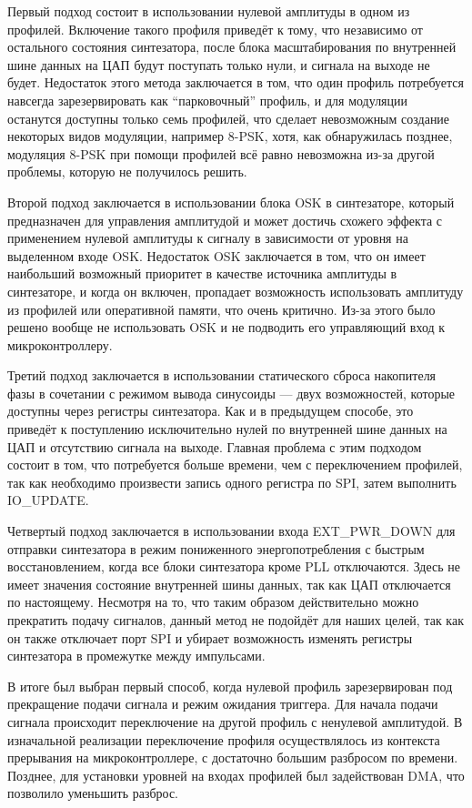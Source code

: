 \documentclass[rusmathsym, eqnumwithinsec, amspack, hyperref]{bomgost}
\begin{document}
Первый подход состоит в использовании нулевой амплитуды в одном из профилей. Включение такого профиля приведёт к тому, что независимо от остального состояния синтезатора, после блока масштабирования по внутренней шине данных на ЦАП будут поступать только нули, и сигнала на выходе не будет. Недостаток этого метода заключается в том, что один профиль потребуется навсегда зарезервировать как ``парковочный'' профиль, и для модуляции останутся доступны только семь профилей, что сделает невозможным создание некоторых видов модуляции, например 8-PSK, хотя, как обнаружилась позднее, модуляция 8-PSK при помощи профилей всё равно невозможна из-за другой проблемы, которую не получилось решить.

Второй подход заключается в использовании блока OSK в синтезаторе, который предназначен для управления амплитудой и может достичь схожего эффекта с применением нулевой амплитуды к сигналу в зависимости от уровня на выделенном входе OSK. Недостаток OSK заключается в том, что он имеет наибольший возможный приоритет в качестве источника амплитуды в синтезаторе, и когда он включен, пропадает возможность использовать амплитуду из профилей или оперативной памяти, что очень критично. Из-за этого было решено вообще не использовать OSK и не подводить его управляющий вход к микроконтроллеру.

Третий подход заключается в использовании статического сброса накопителя фазы в сочетании с режимом вывода синусоиды --- двух возможностей, которые доступны через регистры синтезатора. Как и в предыдущем способе, это приведёт к поступлению исключительно нулей по внутренней шине данных на ЦАП и отсутствию сигнала на выходе. Главная проблема с этим подходом состоит в том, что потребуется больше времени, чем с переключением профилей, так как необходимо произвести запись одного регистра по SPI, затем выполнить IO\_UPDATE.

Четвертый подход заключается в использовании входа EXT\_PWR\_DOWN для отправки синтезатора в режим пониженного энергопотребления с быстрым восстановлением, когда все блоки синтезатора кроме PLL отключаются. Здесь не имеет значения состояние внутренней шины данных, так как ЦАП отключается по настоящему. Несмотря на то, что таким образом действительно можно прекратить подачу сигналов, данный метод не подойдёт для наших целей, так как он также отключает порт SPI и убирает возможность изменять регистры синтезатора в промежутке между импульсами.

В итоге был выбран первый способ, когда нулевой профиль зарезервирован под прекращение подачи сигнала и режим ожидания триггера. Для начала подачи сигнала происходит переключение на другой профиль с ненулевой амплитудой. В изначальной реализации переключение профиля осуществлялось из контекста прерывания на микроконтроллере, с достаточно большим разбросом по времени. Позднее, для установки уровней на входах профилей был задействован DMA, что позволило уменьшить разброс.
\end{document}
